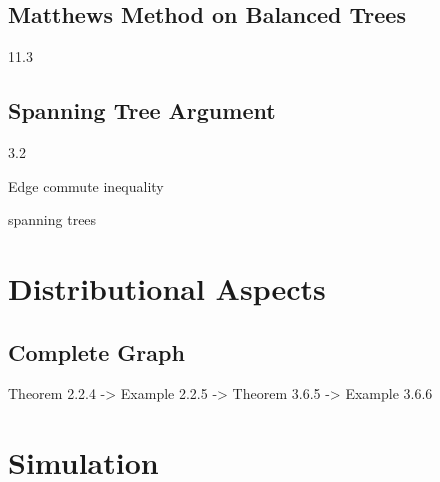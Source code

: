 \documentclass[12pt]{article}
\theoremstyle{definition}
\begin{document}
\subsection{Matthews Method on Balanced Trees}
\cite{LP17} 11.3

\subsection{Spanning Tree Argument}
\cite{AF14} 3.2

Edge commute inequality

spanning trees

\section{Distributional Aspects}
\subsection{Complete Graph}
\cite{Du11}
Theorem 2.2.4 -> Example 2.2.5 -> Theorem 3.6.5 -> Example 3.6.6


\section{Simulation}

\cite{Bo98}
\cite{Gr10}

\newpage
{}

\begin{comment}
\begin{thebibliography}{9}

\bibitem{AF14}
	Aldous, D. and J. Fill.
	2014.
	\textit{Reversible Markov Chains and Random Walks on Graphs}.

\bibitem{BH94}
	Blom, G., L. Holst and D. Sandell.
	\textit{Problems and Snapshots from the World of Probability},
	Springer Science \& Business Media, 1994.

\bibitem{Bo13}
	Bollobás, B.
	2013.
	\textit{Modern Graph Theory},
	Vol. 184,
	Springer Science \& Business Media.

\bibitem{DS84}
	Doyle, P. G. and J. L. Snell.
	1984.
	\textit{Random Walks and Electric Networks},
	Mathematical Association of America.
 
\bibitem{Gr10}
	Grimmett, G.
	2010.
	\textit{Probability on Graphs : Random Processes on Graphs and Lattices},
	Vol. 8,
	Cambridge University Press.

\bibitem{LP08}
	Levin, D. A. and Y. Peres.
	2017.
	\textit{Markov Chains and Mixing Times},
	Vol. 107,
	American Mathematical Society.

\end{thebibliography}
\end{comment}
\end{document}
